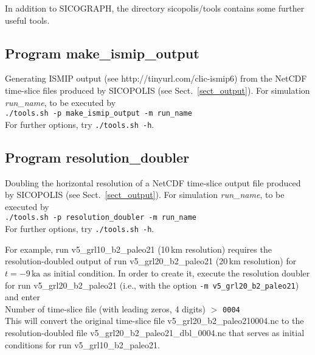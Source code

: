 \documentclass[12pt,a4paper]{article}
\begin{document}
In addition to SICOGRAPH, the directory sicopolis/tools contains some further useful tools.

\subsection{Program make\_ismip\_output}
\label{ssect_make_ismip_output}

Generating ISMIP output (see http://tinyurl.com/clic-ismip6) from the NetCDF time-slice files produced by SICOPOLIS (see Sect.~\ref{sect_output}). For simulation \emph{run\_name}, to be executed by\\
\hspace*{10mm}\verb+./tools.sh -p make_ismip_output -m run_name+\\
For further options, try \verb+./tools.sh -h+.

\subsection{Program resolution\_doubler}
\label{ssect_resolution_doubler}

Doubling the horizontal resolution of a NetCDF time-slice output file produced by SICOPOLIS (see Sect.~\ref{sect_output}). For simulation \emph{run\_name}, to be executed by\\
\hspace*{10mm}\verb+./tools.sh -p resolution_doubler -m run_name+\\
For further options, try \verb+./tools.sh -h+.

For example, run v5\_grl10\_b2\_paleo21 (10\,km resolution) requires the resolution-doub\-led output of run v5\_grl20\_b2\_paleo21 (20\,km resolution) for $t=-9\,\mathrm{ka}$ as initial condition. In order to create it, execute the resolution doubler for run v5\_grl20\_\-b2\_paleo21 (i.e., with the option \verb+-m v5_grl20_b2_paleo21+) and enter
\\
\hspace*{10mm}Number of time-slice file (with leading zeros, 4 digits) $>$
\verb+0004+
\\
This will convert the original time-slice file v5\_grl20\_b2\_paleo210004.nc to the resolution-doubled file v5\_grl20\_b2\_paleo21\_dbl\_0004.nc that serves as initial conditions for run 
\linebreak{}
v5\_grl10\_b2\_paleo21.

\vfill
\end{document}
